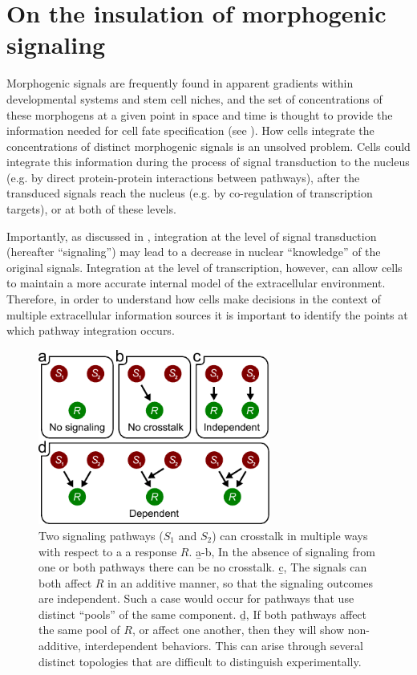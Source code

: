 \chapter{On the insulation of morphogenic signaling}
\label{insulation:introduction}


Morphogenic signals are frequently found in apparent
gradients within developmental systems and stem cell
niches, and the set of concentrations of these
morphogens at a given point in space and time
is thought to provide the information
needed for cell fate specification
(see ).
How cells integrate
the concentrations of distinct morphogenic signals is an
unsolved problem. Cells could integrate this information
during the process of signal transduction to the nucleus (e.g. by
direct protein-protein interactions between pathways),
after the transduced signals reach the nucleus (e.g. by
co-regulation of transcription targets), or at both of
these levels.


Importantly, as discussed in 
, integration at the level of
signal transduction (hereafter ``signaling'')
may lead to a decrease in nuclear
``knowledge'' of the original signals. Integration at
the level of transcription, however, can allow cells
to maintain a more accurate internal model of the
extracellular environment. Therefore, in order to
understand how cells make decisions in the context of
multiple extracellular information sources it is important
to identify the points at which pathway integration occurs.


  \begin{figure}[!bt]
  \centering
  \includegraphics[width=3in]{FIGS/insulation/crosstalk.pdf}
  {\singlespacing 
  \caption[Types of signaling crosstalk.]
        { Two signaling pathways ($S_1$ and $S_2$) can
          crosstalk in multiple ways with respect to a
          a response $R$. \b{a-b}, In the absence of signaling
          from one or both pathways there can be no crosstalk.
          \b{c}, The signals can both affect $R$ in an additive
          manner, so that the signaling outcomes are independent.
          Such a case would occur for pathways that use distinct
          ``pools'' of the same component. \b{d}, If both
          pathways affect the same pool of $R$, or affect one another,
          then they will show
          non-additive, interdependent behaviors.
          This can arise through several distinct
          topologies that are difficult to
          distinguish experimentally.}
  \label{fig:insulation:crosstalk}}
  \end{figure}
  

